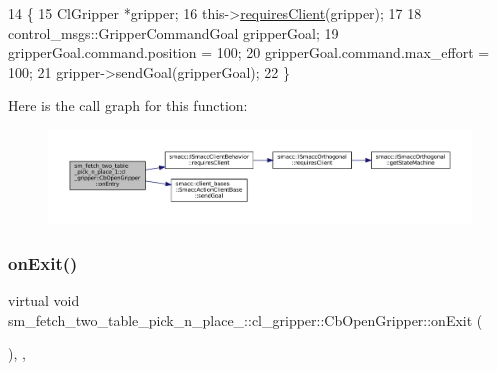 \begin{DoxyCode}
14     \{
15         ClGripper *gripper;
16         this->\hyperlink{classsmacc_1_1ISmaccClientBehavior_a32b16e99e3b4cb289414203dc861a440}{requiresClient}(gripper);
17 
18         control\_msgs::GripperCommandGoal gripperGoal;
19         gripperGoal.command.position = 100;
20         gripperGoal.command.max\_effort = 100;
21         gripper->sendGoal(gripperGoal);
22     \}
\end{DoxyCode}
Here is the call graph for this function\+:
\nopagebreak
\begin{figure}[H]
\begin{center}
\leavevmode
\includegraphics[width=350pt]{classsm__fetch__two__table__pick__n__place__1_1_1cl__gripper_1_1CbOpenGripper_a08f95a8f05e33c1a04b77fa5f3465d78_cgraph}
\end{center}
\end{figure}
\mbox{\label{classsm__fetch__two__table__pick__n__place__1_1_1cl__gripper_1_1CbOpenGripper_aa5943cc677a643e9e7cd5d57766857fc}} 
\subsubsection{\texorpdfstring{on\+Exit()}{onExit()}}
{\footnotesize\ttfamily virtual void sm\+\_\+fetch\+\_\+two\+\_\+table\+\_\+pick\+\_\+n\+\_\+place\+\_\+::cl\+\_\+gripper\+::\+Cb\+Open\+Gripper\+::on\+Exit (\begin{DoxyParamCaption}{ }\end{DoxyParamCaption})\hspace{0.3cm}{\ttfamily [inline]}, {\ttfamily [override]}, {\ttfamily [virtual]}}



